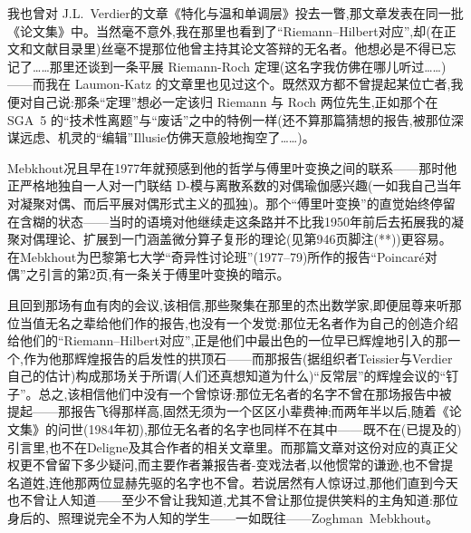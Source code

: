 {我也曾对 J.L.~Verdier的文章《特化与温和单调层》投去一瞥,那文章发表在同一批《论文集》中。当然毫不意外,我在那里也看到了“Riemann--Hilbert对应”,却(在正文和文献目录里)丝毫不提那位他曾主持其论文答辩的无名者。他想必是不得已忘记了……那里还谈到一条平展 Riemann-Roch 定理(这名字我仿佛在哪儿听过……)——而我在 Laumon-Katz 的文章里也见过这个。既然双方都不曾提起某位亡者,我便对自己说:那条“定理”想必一定该归 Riemann 与 Roch 两位先生,正如那个在 SGA~5 的“技术性离题”与“废话”之中的特例一样(还不算那篇猜想的报告,被那位深谋远虑、机灵的“编辑”Illusie仿佛天意般地掏空了……)。

Mebkhout况且早在1977年就预感到他的哲学与傅里叶变换之间的联系——那时他正严格地独自一人对一门联结 D-模与离散系数的对偶瑜伽感兴趣(一如我自己当年对凝聚对偶、而后平展对偶形式主义的孤独)。那个“傅里叶变换”的直觉始终停留在含糊的状态——当时的语境对他继续走这条路并不比我1950年前后去拓展我的凝聚对偶理论、扩展到一门涵盖微分算子复形的理论(见第946页脚注(**))更容易。在Mebkhout为巴黎第七大学“奇异性讨论班”(1977--79)所作的报告“Poincaré对偶”之引言的第2页,有一条关于傅里叶变换的暗示。}

\dmark{}且回到那场有血有肉的会议,该相信,那些聚集在那里的杰出数学家,即便屈尊来听那位当值无名之辈给他们作的报告,也没有一个发觉:那位无名者作为自己的创造介绍给他们的“Riemann--Hilbert对应”,正是他们中最出色的一位早已辉煌地引入的那一个,作为他那辉煌报告的启发性的拱顶石——而那报告(据组织者Teissier与Verdier自己的估计)构成那场关于所谓(人们还真想知道为什么)“反常层”的辉煌会议的“钉子”。总之,该相信他们中没有一个曾惊讶:那位无名者的名字不曾在那场报告中被提起——那报告飞得那样高,固然无须为一个区区小辈费神;而两年半以后,随着《论文集》的问世(1984年初),那位无名者的名字也同样不在其中——既不在(已提及的)引言里,也不在Deligne及其合作者的相关文章里。而那篇文章\dmark{}对这份对应的真正父权更不曾留下多少疑问,而主要作者兼报告者-变戏法者,以他惯常的谦逊,也不曾提名道姓,连他那两位显赫先驱的名字也不曾。若说居然有人惊讶过,那他们直到今天也不曾让人知道——至少不曾让我知道,尤其不曾让那位提供笑料的主角知道:那位身后的、照理说完全不为人知的学生——一如既往——Zoghman~Mebkhout。

